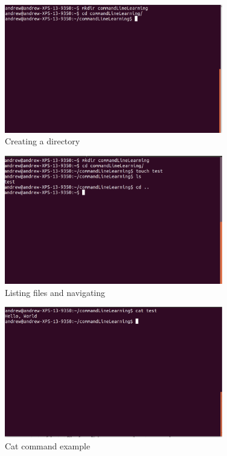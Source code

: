 \begin{figure}
	\centering
	\includegraphics[width=0.85\textwidth]{lectures/images/commandLineTwo.png}
	\caption{Creating a directory}
	\label{fig:linux:two}
\end{figure}

\begin{figure}
	\centering
	\includegraphics[width=0.85\textwidth]{lectures/images/commandLineThree.png}
	\caption{Listing files and navigating}
	\label{fig:linux:three}
\end{figure}

\begin{figure}[ht]
	\centering
	\includegraphics[width=0.85\textwidth]{lectures/images/commandLineFour.png}
	\caption{Cat command example}
	\label{fig:linux:four}
\end{figure}

